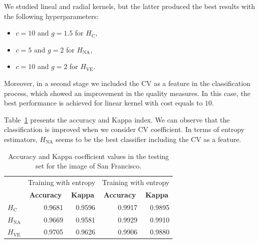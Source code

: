\documentclass[journal]{IEEEtran}
\begin{document}


We studied lineal and radial kernels, but the latter produced the best results with the following hyperparameters:
\begin{itemize}
    \item $c=10$ and $g=1.5$ for $H_\text{C}$,
    \item $c=5$ and $g=2$ for $H_{\text{NA}}$,
    \item $c=10$ and $g=2$ for $H_{\text{VE}}$.
\end{itemize}

Moreover, in a second stage we included the CV as a feature in the classification process, which showed an improvement in the quality measures. In this case, the best performance is achieved for linear kernel with cost equals to $10$.

Table~\ref{tab:acc_SF} presents the accuracy and Kappa index. 
We can observe that the classification is improved when we consider CV coefficient. In terms of entropy estimators, $H_{\text{NA}}$ seems to be the best classifier including the CV as a feature.

\begin{table}[htbp]
  \centering
  \caption{Accuracy and Kappa coefficient values in the testing set for the image of San Francisco.}
    \begin{tabular}{lrrrr}
    	\toprule
          & \multicolumn{2}{c}{\multirow{2}[-2]{*}{Training with entropy}} & \multicolumn{2}{c}{\multirow{2}[-2]{*}{Training with entropy}} \\
          & \multicolumn{2}{c}{estimators} & \multicolumn{2}{c}{estimators and cv} \\ \cmidrule(lr){2-3}\cmidrule(lr){4-5}          
& \multicolumn{1}{c}{\textbf{Accuracy}} & \multicolumn{1}{c}{\textbf{Kappa}} & \multicolumn{1}{c}{\textbf{Accuracy}} & \multicolumn{1}{c}{\textbf{Kappa}} \\
    \cmidrule(lr){2-2}\cmidrule(lr){3-3}\cmidrule(lr){4-4}\cmidrule(lr){5-5}
    $H_\text{C}$    & 0.9681 & 0.9596 & 0.9917 & 0.9895 \\
    $H_{\text{NA}}$   & 0.9669 & 0.9581 & 0.9929 & 0.9910 \\
    $H_{\text{VE}}$   & 0.9705 & 0.9626 & 0.9906 & 0.9880 \\
    \bottomrule
    \end{tabular}%
  \label{tab:acc_SF}%
\end{table}%
\end{document}
